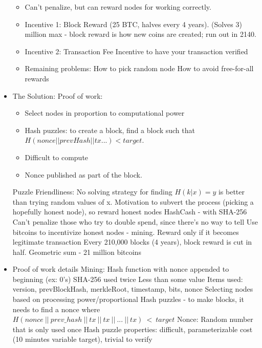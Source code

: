 \documentclass{article}
\begin{document}
\begin{itemize}
    \begin{itemize}
      \item Can't penalize, but can reward nodes for working correctly.
      \item Incentive 1: Block Reward (25 BTC, halves every 4 years). (Solves 3)
         million max - block reward is how new coins are created; run out in 2140.
      \item Incentive 2: Transaction Fee
        \subitem Incentive to have your transaction verified
      \item Remaining problems: 
        \subitem How to pick random node
        \subitem How to avoid free-for-all rewards
    \end{itemize}
  \item The Solution: Proof of work:
    \begin{itemize}
      \item Select nodes in proportion to computational power
      \item Hash puzzles: to create a block, find a block such that $H(nonce || prevHash || tx...) < target$. 
      \item Difficult to compute
      \item Nonce published as part of the block.
    \end{itemize}
    \subitem Puzzle Friendliness: No solving strategy for finding $H(k | x)=y$ is better than
    trying random values of x.
    \subitem Motivation to subvert the process (picking a hopefully honest node), so reward honest nodes
    \subitem HashCash - with SHA-256
    \subitem Can't penalize those who try to double spend, since there's no way to tell
    \subitem Use bitcoins to incentivize honest nodes - mining. Reward only if it becomes legitimate transaction
    \subitem Every 210,000 blocks (4 years), block reward is cut in half. Geometric sum - 21 million bitcoins
  \item Proof of work details
    \subitem Mining: Hash function with nonce appended to beginning (ex: 0's)
    \subitem SHA-256 used twice
    \subitem Less than some value
    \subitem Items used: version, prevBlockHash, merkleRoot, timestamp, bits, nonce
    \subitem Selecting nodes based on processing power/proportional
    \subitem Hash puzzles - to make blocks, it needs to find a nonce where
    \subitem $ H(nonce\ ||\ prev\_hash\ ||\ tx\ ||\ tx\ ||\ ...\ ||\ tx)\ <\ target $
    \subitem Nonce: Random number that is only used once
    \subitem Hash puzzle properties: difficult, parameterizable cost (10 minutes variable target), trivial to verify

\end{itemize}
\end{document}
